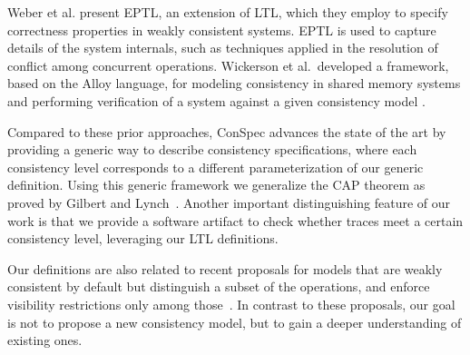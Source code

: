 \documentclass[conference]{IEEEtran}
\begin{document}
	Weber et al. \cite{Weber2017} present EPTL, an extension of LTL,  which they employ to specify correctness properties in weakly consistent systems. EPTL is used to capture  details of the system internals, such as techniques applied in the resolution of conflict among concurrent operations. Wickerson et al.\ developed a framework, based on the Alloy language, for modeling consistency in shared memory systems and performing verification of a system against a given consistency model  \cite{Wickerson:2017:ACM:3009837.3009838}.
	
	
	Compared to these prior approaches, ConSpec advances the state of the art by providing a generic way to describe consistency specifications, where each consistency level corresponds to a different parameterization of our generic definition.  Using this generic framework we generalize the CAP theorem as proved by Gilbert and Lynch~\cite{Gilbert:2002:BCF:564585.564601}. Another important distinguishing feature of our work is that we provide a software artifact to check whether traces meet a certain consistency level, leveraging our LTL definitions. %
	
	Our definitions are also related to recent proposals for models that are weakly consistent by default but distinguish a subset of the operations, and enforce visibility restrictions only among those~\cite{Li:2012:MGS:2387880.2387906, Gotsman:2016:CIS:2837614.2837625, cheng-papoc}. In contrast to these proposals, our goal is not to propose a new consistency model, but to gain a deeper understanding of existing ones.
	
\end{document}
